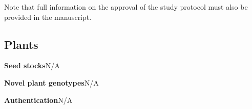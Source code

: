 \documentclass{article}
\begin{document}
{\small Note that full information on the approval of the study protocol must also be provided in the manuscript.}

\subsection*{Plants}

\begin{hangpars}
\textbf{Seed stocks}\quad N/A

\textbf{Novel plant genotypes}\quad N/A

\textbf{Authentication}\quad N/A
\end{hangpars}
\end{document}
